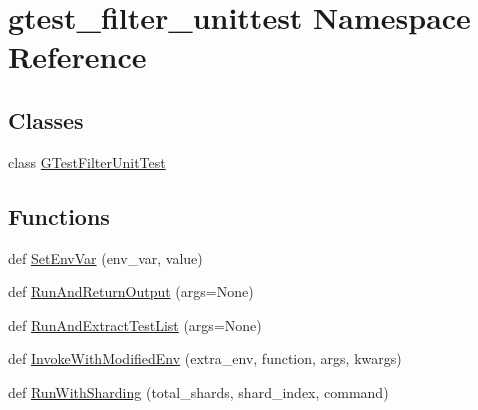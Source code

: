 \hypertarget{namespacegtest__filter__unittest}{}\section{gtest\+\_\+filter\+\_\+unittest Namespace Reference}
\label{namespacegtest__filter__unittest}
\subsection*{Classes}
\begin{DoxyCompactItemize}
\item 
class \hyperlink{classgtest__filter__unittest_1_1_g_test_filter_unit_test}{G\+Test\+Filter\+Unit\+Test}
\end{DoxyCompactItemize}
\subsection*{Functions}
\begin{DoxyCompactItemize}
\item 
def \hyperlink{namespacegtest__filter__unittest_a8ba027a73134bf97696651252457b492}{Set\+Env\+Var} (env\+\_\+var, value)
\item 
def \hyperlink{namespacegtest__filter__unittest_abb83ed30067e0d13161fd89868ed476b}{Run\+And\+Return\+Output} (args=None)
\item 
def \hyperlink{namespacegtest__filter__unittest_aaf6916ce9c936a238afeb79a4d326a12}{Run\+And\+Extract\+Test\+List} (args=None)
\item 
def \hyperlink{namespacegtest__filter__unittest_a2bfd6ae10e7002148bc25e505bd61534}{Invoke\+With\+Modified\+Env} (extra\+\_\+env, function, args, kwargs)
\item 
def \hyperlink{namespacegtest__filter__unittest_a4d88cc7e4faf5305640a66dc487b33fb}{Run\+With\+Sharding} (total\+\_\+shards, shard\+\_\+index, command)
\end{DoxyCompactItemize}
